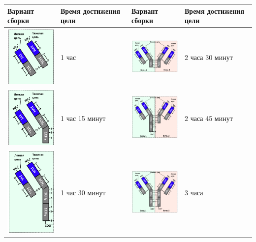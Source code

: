 \begin{table}[H]
	\begin{center}
		\begin{tabular}{|p{3.5cm}|p{2.5cm}|p{3.5cm}|p{2.5cm}|}
			\hline
			Вариант сборки&	Время достижения цели&	Вариант сборки&	Время достижения цели \\
			\hline
			\includegraphics[width=3cm]{6} & 1 час	& \includegraphics[width=3cm]{7} &	2 часа 30 минут \\
			\hline
			\includegraphics[width=3cm]{8} &1 час 15 минут & \includegraphics[width=3cm]{9} &2 часа 45 минут \\
			\hline
			\includegraphics[width=3cm]{10} & 1 час 30 минут& \includegraphics[width=3cm]{11} & 3 часа	\\
			\hline	
		\end{tabular}
	\end{center}
\end{table}

